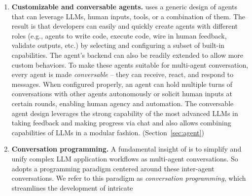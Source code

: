 \begin{enumerate}[leftmargin=*]
    \vspace{-2mm}
    \setlength\itemsep{-0.1em}
    \item[1] \textbf{Customizable and conversable agents.} \libName uses a generic design of agents that can leverage LLMs, human inputs, tools, or a combination of them. 
    The result is that developers can easily and quickly create agents with different roles (e.g., agents to write code, execute code, wire in human feedback, validate outputs, etc.) by selecting and configuring a subset of built-in capabilities. The agent's backend can also be readily extended to allow more custom behaviors.  %
    To make these agents suitable for multi-agent conversation, every
    agent is made {\em conversable}
    -- they can receive, react, and respond to messages. 
     When configured properly, an agent can hold multiple turns of conversations with other agents autonomously or solicit human inputs at certain rounds, enabling human agency and automation.
     The conversable agent design leverages the strong capability of the most advanced LLMs in taking feedback and making progress via chat
    and also allows combining capabilities of LLMs in a modular fashion.   (Section~\ref{sec:agent}) 
    \item[2] \textbf{Conversation programming.} 
    A fundamental insight of \libName is to simplify and unify complex LLM application workflows as multi-agent conversations.
    So \libName adopts a programming paradigm centered around these inter-agent conversations. We refer to this paradigm as \emph{conversation programming},  which streamlines the development of intricate %

\end{enumerate}
